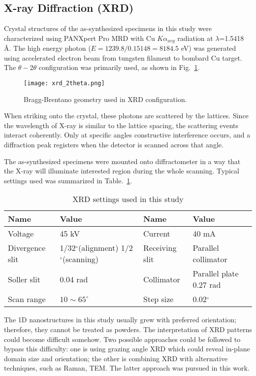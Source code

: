 \subsection{X-ray Diffraction (XRD)}
Crystal structures of the as-synthesized specimens in this study were characterized using PANXpert Pro MRD with Cu $K\alpha_{avg}$ radiation at $\lambda$=1.5418 \si{\angstrom}. The high energy photon ($E = 1239.8/0.15148= 8184.5$ eV) was generated using accelerated electron beam from tungsten filament to bombard Cu target. The $\theta-2\theta$ configuration was primarily used, as shown in Fig.~\ref{fig:ch2theta}. 
\begin{figure}[htb]
\centering
\texttt{[image: xrd\_2theta.png]}
\caption[Bragg-Brentano geometry used in XRD configuration]{Bragg-Brentano geometry used in XRD configuration.\cite{Good2000}}
\label{fig:ch2theta}
\end{figure}
When striking onto the crystal, these photons are scattered by the lattices. Since the wavelength of X-ray is similar to the lattice spacing, the scattering events interact coherently. Only at specific angles constructive interference occurs, and a diffraction peak registers when the detector is scanned across that angle.  

The as-synthesized specimens were mounted onto diffractometer in a way that the X-ray will illuminate interested region during the whole scanning. Typical settings used was summarized in Table.~\ref{tab:ch2xrd}.

\begin{table}[htb]
\centering
\caption{XRD settings used in this study}\label{tab:ch2xrd}
\begin{tabular}{lp{1.5in}lp{1.5in}}
\toprule
Name & Value & Name & Value  \\
\midrule
Voltage   & 45 kV & Current & 40 mA \\
Divergence slit & 1/32$^\circ$(alignment) 1/2$^\circ$(scanning) & Receiving slit& Parallel collimator \\
Soller slit & 0.04 rad & Collimator & Parallel plate 0.27 rad \\
Scan range & $10 \sim 65 ^\circ$ & Step size & 0.02$^\circ$ \\
\bottomrule
\end{tabular}
\end{table}

The 1D nanostructures in this study usually grew with preferred orientation; therefore, they cannot be treated as powders. The interpretation of XRD patterns could become difficult somehow. Two possible approaches could be followed to bypass this difficulty: one is using grazing angle XRD which could reveal in-plane domain size and orientation;\cite{Tersigni2011,Goorsky2002} the other is combining XRD with alternative techniques, such as Raman, TEM. The latter approach was pursued in this work. 


